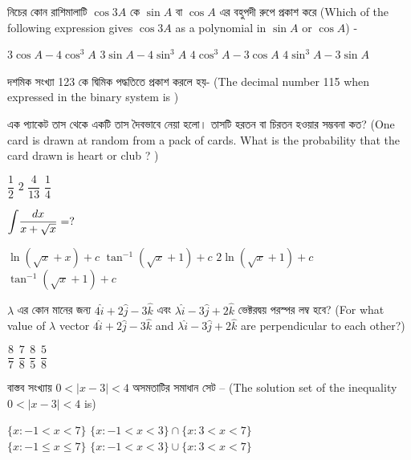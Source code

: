 \documentclass[addpoints]{exam}
\begin{document}
\begin{questions}
\question নিচের কোন রাশিমালাটি $ \cos 3A $ কে $ \sin A $ বা $ \cos A $ এর বহুপদী রুপে প্রকাশ করে (Which of the following expression gives  $ \cos 3A $ as a polynomial in $ \sin A $ or $ \cos A $) -

\begin{oneparchoices}
\choice  $ 3\cos A -4\cos^{3} A $
\choice  $ 3\sin A -4\sin^{3} A $
\choice  $ 4\cos^{3} A -3\cos A $
\choice  $ 4\sin^{3} A -3\sin A $
\end{oneparchoices}

\question দশমিক সংখ্যা 123 কে দ্বিমিক পদ্ধতিতে প্রকাশ করলে হয়- (The decimal number 115 when expressed in the binary system is )

\begin{oneparchoices}
\end{oneparchoices}

\question এক প্যাকেট তাস থেকে একটি তাস দৈবভাবে নেয়া হলো। তাসটি হরতন বা চিরতন হওয়ার সম্ভবনা কত? (One card is drawn at random from a pack of cards. What is the probability that the card drawn is heart or club ? )

\begin{oneparchoices}
\choice $ \dfrac{1}{2} $
\choice $ 2 $
\choice $ \dfrac{4}{13} $
\choice  $ \dfrac{1}{4} $
\end{oneparchoices}

\question  $ \mathlarger{\int}\dfrac{dx}{x+\sqrt{x}} =? $

\begin{oneparchoices}
\choice $ \ln (\sqrt{x} +x) +c$
\choice $ \tan^{-1}(\sqrt{x}+1)+c $
\choice $ 2\ln (\sqrt{x}+1)+c  $
\choice  $ \tan^{-1}(\sqrt{x}+1)+c $
\end{oneparchoices}

\question  $ \lambda $ এর কোন মানের জন্য  $ 4\hat{i}+2\hat{j}-3\hat{k} $ এবং  $ \lambda\hat{i}-3\hat{j}+2\hat{k} $  ভেক্টরদ্বয় পরস্পর লম্ব হবে? (For what value of $ \lambda $ vector $ 4\hat{i}+2\hat{j}-3\hat{k} $ and $ \lambda\hat{i}-3\hat{j}+2\hat{k} $ are perpendicular to each other?)

\begin{oneparchoices}
\choice $ \dfrac{8}{7} $
\choice $ \dfrac{7}{8} $
\choice $ \dfrac{8}{5} $
\choice  $\dfrac{5}{8} $
\end{oneparchoices}

\question বাস্তব সংখ্যায় $ 0<|x-3|<4 $ অসমতাটির সমাধান সেট – (The solution set of the inequality $ 0<|x-3|<4 $ is)

\begin{oneparchoices}
\choice $ \{x:-1<x<7\} $
\choice $  \{x:-1<x<3\} \cap \{x: 3<x<7\}  $\\
\hspace*{-.3cm}\choice $  \{x:-1\le x \le 7\} $
\choice $  \{x:-1<x<3\} \cup \{x: 3<x<7\}$  
\end{oneparchoices}


\end{questions}
\end{document}
